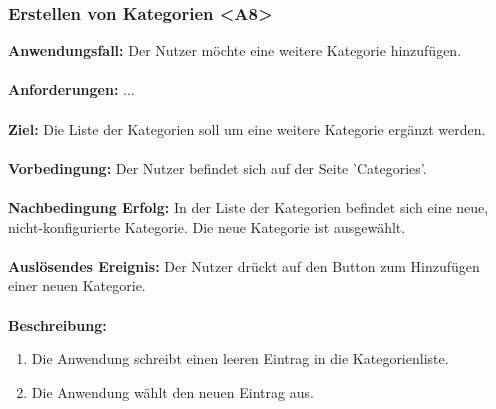 \documentclass[parskip=full]{scrartcl} %
\begin{document}
\subsubsection*{Erstellen von Kategorien <A8>}
\textbf{Anwendungsfall:} Der Nutzer möchte eine weitere Kategorie hinzufügen.\\\\
\textbf{Anforderungen:} ...\\\\
\textbf{Ziel:} Die Liste der Kategorien soll um eine weitere Kategorie ergänzt werden. \\\\
\textbf{Vorbedingung:} Der Nutzer befindet sich auf der Seite 'Categories'. \\\\
\textbf{Nachbedingung Erfolg:} In der Liste der Kategorien befindet sich eine neue, nicht-konfigurierte Kategorie. Die neue Kategorie ist ausgewählt.\\\\
\textbf{Auslösendes Ereignis:} Der Nutzer drückt auf den Button zum Hinzufügen einer neuen Kategorie. \\\\
\textbf{Beschreibung:}
\begin{enumerate}
    \item Die Anwendung schreibt einen leeren Eintrag in die Kategorienliste.
    \item Die Anwendung wählt den neuen Eintrag aus.
\end{enumerate}
\newpage
\end{document}
